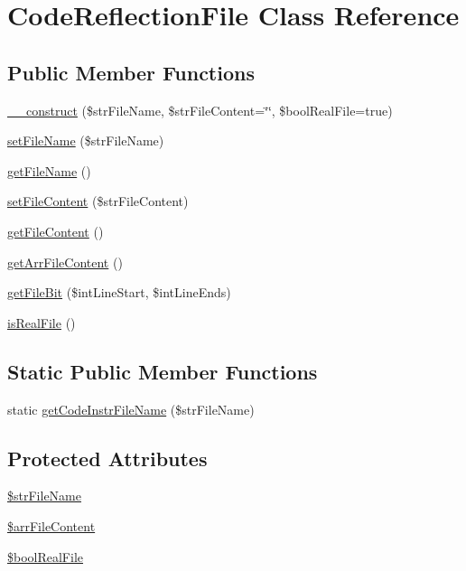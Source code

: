 \hypertarget{class_code_reflection_file}{
\section{CodeReflectionFile Class Reference}
\label{class_code_reflection_file}
}
\subsection*{Public Member Functions}
\begin{CompactItemize}
\item 
\hyperlink{class_code_reflection_file_e56ba959bafd263049238cb91edcc360}{\_\-\_\-construct} (\$strFileName, \$strFileContent=\char`\"{}\char`\"{}, \$boolRealFile=true)
\item 
\hyperlink{class_code_reflection_file_14fd91733dbcc57d74df9c22e0c84e72}{setFileName} (\$strFileName)
\item 
\hyperlink{class_code_reflection_file_fdeebfe3fcf5806fc79c074a6a3a6eb1}{getFileName} ()
\item 
\hyperlink{class_code_reflection_file_7b63a5adb1ae468f9cae2f4ee183f61b}{setFileContent} (\$strFileContent)
\item 
\hyperlink{class_code_reflection_file_df23cc1c442ffc832d008858b5c9cc48}{getFileContent} ()
\item 
\hyperlink{class_code_reflection_file_547f53cf60e90cb214810882a83b8ee1}{getArrFileContent} ()
\item 
\hyperlink{class_code_reflection_file_733f07a956daf8b051ebe61b49d69ce9}{getFileBit} (\$intLineStart, \$intLineEnds)
\item 
\hyperlink{class_code_reflection_file_b4f25d8d159fec063aa515e91ccd5c97}{isRealFile} ()
\end{CompactItemize}
\subsection*{Static Public Member Functions}
\begin{CompactItemize}
\item 
static \hyperlink{class_code_reflection_file_812ea520bce2f3c079e273a0db5c2583}{getCodeInstrFileName} (\$strFileName)
\end{CompactItemize}
\subsection*{Protected Attributes}
\begin{CompactItemize}
\item 
\hyperlink{class_code_reflection_file_f2f34642a0d84201c7dc5604c26a5f87}{\$strFileName}
\item 
\hyperlink{class_code_reflection_file_9d6f198c857dfdf23e2bfdfe3e6d7d15}{\$arrFileContent}
\item 
\hyperlink{class_code_reflection_file_bf37456404912df1c2bd416e9a3b3adc}{\$boolRealFile}
\end{CompactItemize}
